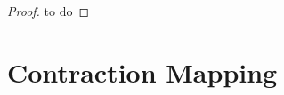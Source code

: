 \begin{theorem}\label{theorem:Hahn-Banach theorem}
\end{theorem}

\begin{proof}
to do
\end{proof}

\section{Contraction Mapping}

\begin{theorem}
\end{theorem}

\begin{theorem}
\end{theorem}

\begin{theorem}
\end{theorem}


